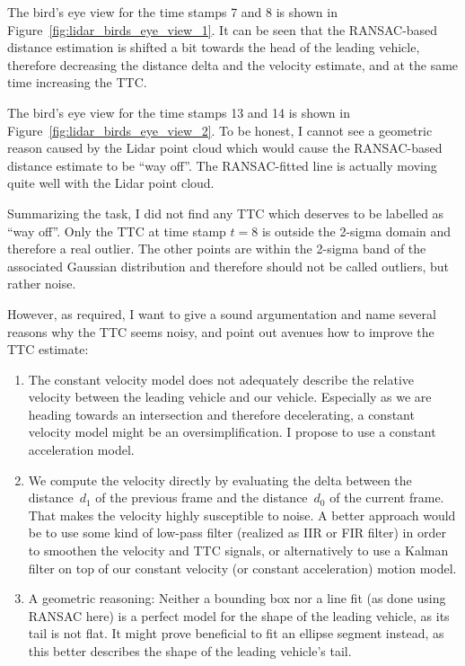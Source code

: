 \documentclass[a4paper]{scrartcl}
\begin{document}
The bird's eye view for the time stamps 7 and 8
is shown in Figure~\ref{fig:lidar_birds_eye_view_1}.
It can be seen that the RANSAC-based distance estimation
is shifted a bit towards the head of the leading
vehicle, therefore decreasing the distance
delta and the velocity estimate, and at the same
time increasing the TTC.

The bird's eye view for the time stamps 13 and 14
is shown in Figure~\ref{fig:lidar_birds_eye_view_2}.
To be honest, I cannot see a geometric reason
caused by the Lidar point cloud which would
cause the RANSAC-based
distance estimate to be ``way off''.
The RANSAC-fitted line is actually moving quite
well with the Lidar point cloud.

Summarizing the task, I did not find any TTC which
deserves to be labelled as ``way off''.
Only the TTC at time stamp $t=8$ is outside the
2-sigma domain and therefore a real outlier.
The other points are within the 2-sigma band of the
associated Gaussian distribution and therefore should not
be called outliers, but rather noise.

However, as required,
I want to give a sound argumentation and
name several reasons why the TTC seems noisy,
and point out avenues how to improve the TTC estimate:
\begin{enumerate}
	\item The constant velocity model does not adequately
		describe the relative velocity between the leading
		vehicle and our vehicle.
		Especially as we are heading towards an intersection
		and therefore decelerating, a constant velocity
		model might be an oversimplification.
		I propose to use a constant acceleration model.
	\item We compute the velocity directly by
		evaluating the delta between the distance~$d_1$
		of the previous frame and the distance~$d_0$
		of the current frame.
		That makes the velocity highly susceptible to noise.
		A better approach would be to use some kind of
		low-pass filter
		(realized as IIR or FIR filter) in order to smoothen the
		velocity and TTC signals, or alternatively
		to use a Kalman filter on top of our
		constant velocity (or constant acceleration)
		motion model.
	\item A geometric reasoning:
		Neither a bounding box nor a line fit
		(as done using RANSAC here) is a perfect model
		for the shape of the leading vehicle, as its
		tail is not flat.
		It might prove beneficial to fit an ellipse
		segment instead, as this better describes the
		shape of the leading vehicle's tail.
\end{enumerate}
\end{document}
